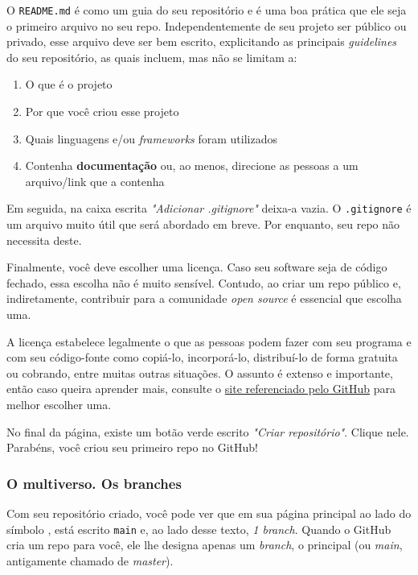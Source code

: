 \documentclass{article}
\begin{document}
	
	O \texttt{README.md} é como um guia do seu repositório e é uma boa prática que ele seja o primeiro arquivo no seu repo. 
	Independentemente de seu projeto ser público ou privado, esse arquivo deve ser bem escrito, explicitando as principais 
	\textit{guidelines} do seu repositório, as quais incluem, mas não se limitam a: 

	\begin{enumerate}
		\item{O que é o projeto}
		\item{Por que você criou esse projeto}
		\item{Quais linguagens e/ou \textit{frameworks} foram utilizados}
		\item{Contenha \textbf{documentação} ou, ao menos, direcione as pessoas a um arquivo/link que a contenha}
	\end{enumerate}

	Em seguida, na caixa escrita \textit{"Adicionar .gitignore"} deixa-a vazia. O \texttt{.gitignore} é um arquivo muito útil 
	que será abordado em breve. Por enquanto, seu repo não necessita deste. 
	
	Finalmente, você deve escolher uma licença. Caso seu software seja de código fechado, essa escolha não é muito sensível.
	Contudo, ao criar um repo público e, indiretamente, contribuir para a comunidade \textit{open source} é essencial que escolha 
	uma.

	A licença estabelece legalmente o que as pessoas podem fazer com seu programa e com seu código-fonte como copiá-lo, incorporá-lo,
	distribuí-lo de forma gratuita ou cobrando, entre muitas outras situações. O assunto é extenso e importante, então caso queira 
	aprender mais, consulte o \href{https://choosealicense.com/}{site referenciado pelo GitHub} para melhor escolher uma.

	No final da página, existe um botão verde escrito \textit{"Criar repositório"}. Clique nele. Parabéns, você criou seu primeiro 
	repo no GitHub!

	\subsubsection{O multiverso. Os branches}
	\label{sec:branches}

	Com seu repositório criado, você pode ver que em sua página principal ao lado do símbolo , está
	escrito \texttt{main} e, ao lado desse texto, \textit{1 branch}. Quando o GitHub cria um repo para você, ele lhe designa 
	apenas um \textit{branch}, o principal (ou \textit{main}, antigamente chamado de \textit{master}). 
	
\end{document}
